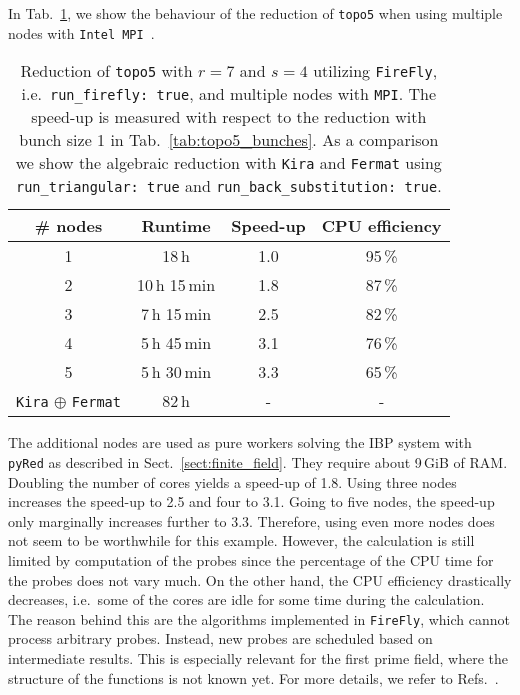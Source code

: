 \documentclass[11pt,a4paper,DIV=11,numbers=noenddot,parskip=half]{scrartcl}
\newcommand{\code}[1]{\texttt{#1}}
\newcommand*{\kira}{\code{Kira}}
\newcommand*{\pyred}{\code{pyRed}}
\newcommand*{\firefly}{\code{FireFly}}
\newcommand*{\fermat}{\code{Fermat}}
\begin{document}
In Tab.~\ref{tab:topo5_mpi}, we show the behaviour of the reduction of \code{topo5} when using multiple nodes with \code{Intel\textsuperscript{\textregistered} MPI}~\cite{intelmpi}.
%
\begin{table}[ht]
  \begin{center}
    \caption{Reduction of \code{topo5} with $r = 7$ and $s = 4$ utilizing \firefly{}, i.e.\ \code{run\_firefly:\ true}, and multiple nodes with \code{MPI}.
    The speed-up is measured with respect to the reduction with bunch size 1 in Tab.~\ref{tab:topo5_bunches}.
    As a comparison we show the algebraic reduction with \kira{} and \fermat{} using \code{run\_triangular:\ true} and \code{run\_back\_substitution:\ true}.}
    \label{tab:topo5_mpi}
    {\renewcommand{\arraystretch}{1.3}
    \begin{tabular}{c|c c c}
      \toprule
      \# nodes & Runtime & Speed-up & CPU efficiency \\
      \midrule
      1 & 18\,h & 1.0 & 95\,\% \\
      2 & 10\,h 15\,min & 1.8 & 87\,\% \\
      3 & 7\,h 15\,min & 2.5 & 82\,\% \\
      4 & 5\,h 45\,min & 3.1 & 76\,\% \\
      5 & 5\,h 30\,min & 3.3 & 65\,\% \\
      \midrule
      \kira{} $\oplus$ \fermat{} & 82\,h & - & - \\
      \bottomrule
    \end{tabular}}
  \end{center}
\end{table}
%
The additional nodes are used as pure workers solving the IBP system with \pyred{} as described in Sect.~\ref{sect:finite_field}.
They require about 9\,GiB of RAM.
Doubling the number of cores yields a speed-up of 1.8.
Using three nodes increases the speed-up to 2.5 and four to 3.1.
Going to five nodes, the speed-up only marginally increases further to 3.3.
Therefore, using even more nodes does not seem to be worthwhile for this example.
However, the calculation is still limited by computation of the probes since the percentage of the CPU time for the probes does not vary much.
On the other hand, the CPU efficiency drastically decreases, i.e.\ some of the cores are idle for some time during the calculation.
The reason behind this are the algorithms implemented in \firefly{}, which cannot process arbitrary probes.
Instead, new probes are scheduled based on intermediate results.
This is especially relevant for the first prime field, where the structure of the functions is not known yet.
For more details, we refer to Refs.~\cite{Klappert:2019emp,Klappert:2020aqs}.
\end{document}
